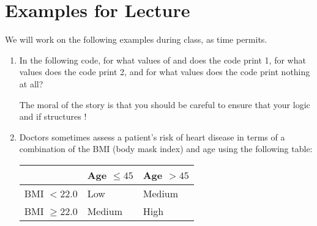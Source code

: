 \documentclass[letterpaper,10pt,english]{sphinxmanual}
\begin{document}
\section{Examples for Lecture}
\label{\detokenize{lecture_notes/lec11_conditionals2:examples-for-lecture}}
We will work on the following examples during class, as time permits.
\begin{enumerate}
\item {} 
In the following code, for what values of  and  does the
code print 1, for what values does the code print 2, and for what
values does the code print nothing at all?

%
\begin{sphinxVerbatim}[commandchars=\\\{\}]
   
       
           
             
         
\end{sphinxVerbatim}

The moral of the story is that you should be careful to ensure that
your logic and if structures !

\item {} 
Doctors sometimes assess a patient’s risk of heart disease in terms of a
combination of the BMI (body mask index) and age using the following
table:


\begin{savenotes}\sphinxattablestart
\centering
\begin{tabulary}{\linewidth}[t]{|T|T|T|}
\hline
\sphinxstyletheadfamily &\sphinxstyletheadfamily 
Age \(\leq 45\)
&\sphinxstyletheadfamily 
Age \(> 45\)
\\
\hline
BMI \(< 22.0\)
&
Low
&
Medium
\\
\hline
BMI \(\geq 22.0\)
&
Medium
&
High
\\
\hline
\end{tabulary}
\par
\sphinxattableend\end{savenotes}


\end{enumerate}
\end{document}
